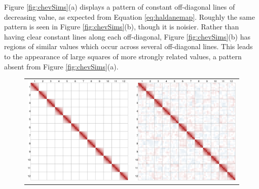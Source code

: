 \documentclass[12pt]{article}
\begin{document}
Figure \ref{fig:chevSims}(a) displays a pattern of constant off-diagonal lines of decreasing value, as expected from Equation \ref{eq:haldanemap}. Roughly the same pattern is seen in Figure \ref{fig:chevSims}(b), though it is noisier. Rather than having clear constant lines along each off-diagonal, Figure \ref{fig:chevSims}(b) has regions of similar values which occur across several off-diagonal lines. This leads to the appearance of large squares of more strongly related values, a pattern absent from Figure \ref{fig:chevSims}(a).

\begin{figure}[h!]
  \begin{center}
    \begin{tabular}{cc}
      \includegraphics[scale=0.4]{../img/LBSimTheory.png} &
      \includegraphics[scale=0.4]{../img/LBSim.png} \\

\end{tabular}
\end{center}
\end{figure}
\end{document}
